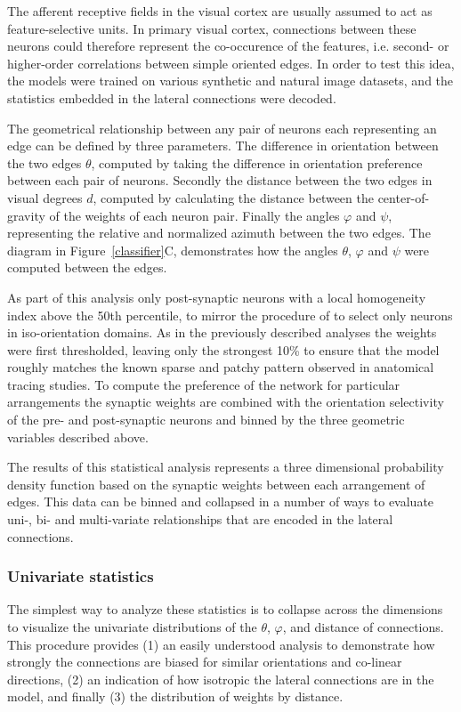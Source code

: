 The afferent receptive fields in the visual cortex are usually assumed
to act as feature-selective units. In primary visual cortex,
connections between these neurons could therefore represent the
co-occurence of the features, i.e. second- or higher-order
correlations between simple oriented edges. In order to test this
idea, the models were trained on various synthetic and natural image
datasets, and the statistics embedded in the lateral connections were
decoded.

The geometrical relationship between any pair of neurons each
representing an edge can be defined by three parameters. The
difference in orientation between the two edges $\theta$, computed by
taking the difference in orientation preference between each pair of
neurons. Secondly the distance between the two edges in visual degrees
$d$, computed by calculating the distance between the
center-of-gravity of the weights of each neuron pair. Finally the
angles $\varphi$ and $\psi$, representing the relative and normalized
azimuth between the two edges. The diagram in
Figure~\ref{classifier}C, demonstrates how the angles $\theta$, $\varphi$
and $\psi$ were computed between the edges.

As part of this analysis only post-synaptic neurons with a local
homogeneity index above the 50th percentile, to mirror the procedure
of \cite{Bosking1997} to select only neurons in iso-orientation
domains. As in the previously described analyses the weights were
first thresholded, leaving only the strongest 10\% to ensure that the
model roughly matches the known sparse and patchy pattern observed in
anatomical tracing studies. To compute the preference of the network
for particular arrangements the synaptic weights are combined with the
orientation selectivity of the pre- and post-synaptic neurons and
binned by the three geometric variables described above.

The results of this statistical analysis represents a three
dimensional probability density function based on the synaptic weights
between each arrangement of edges. This data can be binned and
collapsed in a number of ways to evaluate uni-, bi- and multi-variate
relationships that are encoded in the lateral connections.

\subsubsection*{Univariate statistics}

The simplest way to analyze these statistics is to collapse across the
dimensions to visualize the univariate distributions of the $\theta$,
$\varphi$, and distance of connections. This procedure provides (1) an
easily understood analysis to demonstrate how strongly the connections
are biased for similar orientations and co-linear directions, (2) an
indication of how isotropic the lateral connections are in the model,
and finally (3) the distribution of weights by distance.


